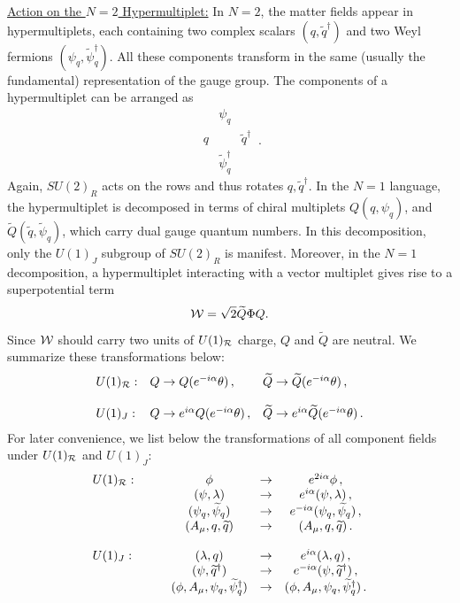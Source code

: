 \noindent\underline{Action on the $N=2$ Hypermultiplet:}
In $N=2$, the matter fields appear in hypermultiplets, each containing
two complex scalars $(q,\widetilde q^\dagger)$ and two Weyl fermions
$(\psi_q,\widetilde\psi^\dagger_q)$. All these components transform in
the same (usually the fundamental) representation of the gauge group.
The components of a hypermultiplet can be arranged as 
$$
\begin{array}{ccc}
 & \psi_q & \\
 q & & \widetilde q^\dagger \\
 & \widetilde\psi_q^\dagger &
\end{array}\,. 
$$
Again, $SU(2)_R$ acts on the rows and thus rotates $q,\widetilde
q^\dagger$. In the $N=1$ language, the hypermultiplet is decomposed in
terms of chiral multiplets $Q(q,\psi_q)$, and $\widetilde Q(\widetilde
q,\widetilde\psi_q)$, which carry dual gauge quantum numbers. In this
decomposition, only the $U(1)_J$ subgroup of $SU(2)_R$ is
manifest. Moreover, in the $N=1$ decomposition, a hypermultiplet
interacting with a vector multiplet gives rise to a superpotential
term
$$
{\cal W} = \sqrt{2} \widetilde Q \Phi Q.
$$
Since ${\cal W}$ should carry two units of $U(1)_{\cal R}$ charge,
$Q$ and $\widetilde Q$ are neutral. We summarize these transformations
below: 
\begin{equation}
\begin{array}{lll}
U(1)_{\cal R}: &Q \rightarrow Q(e^{-i\alpha}\theta)\,,
& \widetilde Q \rightarrow \widetilde Q (e^{-i\alpha}\theta)\,, \\ \\
U(1)_J : &Q\rightarrow e^{i\alpha} Q(e^{-i\alpha}\theta)\,,
&\widetilde Q\rightarrow e^{i\alpha}\widetilde Q(e^{-i\alpha}\theta)\,. 
\end{array}
\label{Rb2}
\end{equation}
For later convenience, we list below the transformations of all
component fields under $U(1)_{\cal R}$ and $U(1)_J$:
$$
\begin{array}{lccc} 
U(1)_{\cal R}:\qquad & \phi &\rightarrow & e^{2i\alpha}\phi\,, \\
&(\psi,\lambda)&\rightarrow & e^{i\alpha}(\psi,\lambda)\,, \\
&(\psi_q,\widetilde\psi_q)&\rightarrow &e^{-i\alpha} 
(\psi_q,\widetilde\psi_q)\,, \\
&(A_\mu, q, \widetilde q)&\rightarrow & (A_\mu, q, \widetilde q)\,.
\\ \\
U(1)_J: &(\lambda, q)&\rightarrow & e^{i\alpha}(\lambda, q)\,,\\
&(\psi,\widetilde q^\dagger)&\rightarrow & e^{-i\alpha}
(\psi,\widetilde q^\dagger)\,,\\
&(\phi, A_\mu, \psi_q,\widetilde\psi_q^\dagger)&\rightarrow &
(\phi, A_\mu, \psi_q,\widetilde\psi_q^\dagger)\,.
\end{array}
$$
